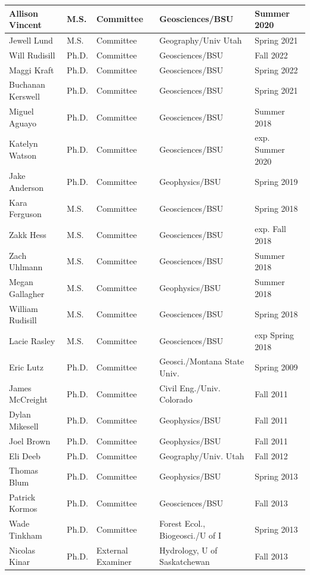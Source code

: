 \documentclass[11pt]{article}
\begin{document}
\begin{table}[!htbp]
\begin{tabular}{|l|l|l|l|l|}
Allison Vincent & M.S. & Committee & Geosciences/BSU & Summer 2020 \\ \hline
Jewell Lund & M.S. & Committee & Geography/Univ Utah & Spring 2021 \\ \hline
Will Rudisill & Ph.D. & Committee & Geosciences/BSU & Fall 2022 \\ \hline
Maggi Kraft & Ph.D. & Committee & Geosciences/BSU & Spring 2022 \\ \hline
Buchanan Kerswell & Ph.D. & Committee & Geosciences/BSU & Spring 2021 \\ \hline
Miguel Aguayo & Ph.D. & Committee & Geosciences/BSU & Summer 2018 \\ \hline
Katelyn Watson & Ph.D. & Committee & Geosciences/BSU & exp. Summer 2020 \\ \hline
Jake Anderson & Ph.D. & Committee & Geophysics/BSU & Spring 2019 \\ \hline
Kara Ferguson & M.S. & Committee & Geosciences/BSU & Spring 2018 \\ \hline
Zakk Hess & M.S. & Committee & Geosciences/BSU & exp. Fall 2018 \\ \hline
Zach Uhlmann & M.S. & Committee & Geosciences/BSU & Summer 2018 \\ \hline
Megan Gallagher & M.S. & Committee & Geophysics/BSU & Summer 2018 \\ \hline
William Rudisill & M.S. & Committee & Geosciences/BSU & Spring 2018 \\ \hline
Lacie Rasley & M.S. & Committee & Geosciences/BSU & exp Spring 2018 \\ \hline
Eric Lutz & Ph.D. & Committee & Geosci./Montana State Univ. & Spring 2009 \\ \hline
James McCreight & Ph.D. & Committee & Civil Eng./Univ. Colorado & Fall 2011 \\ \hline
Dylan Mikesell & Ph.D. & Committee & Geophysics/BSU & Fall 2011 \\ \hline
Joel Brown & Ph.D. & Committee & Geophysics/BSU & Fall 2011 \\ \hline
Eli Deeb & Ph.D. & Committee & Geography/Univ. Utah & Fall 2012 \\ \hline
Thomas Blum & Ph.D. & Committee & Geophysics/BSU & Spring 2013 \\ \hline
Patrick Kormos & Ph.D. & Committee & Geosciences/BSU & Fall 2013 \\ \hline
Wade Tinkham & Ph.D. & Committee & Forest Ecol., Biogeosci./U of I  & Spring 2013 \\ \hline
Nicolas Kinar & Ph.D. & External Examiner & Hydrology, U of Saskatchewan & Fall 2013 \\ \hline

\end{tabular}
\end{table}
\end{document}
